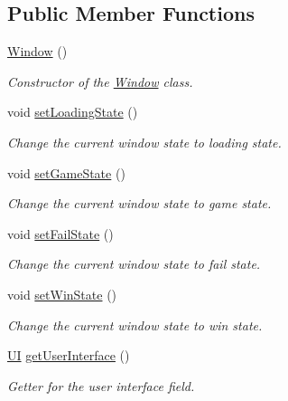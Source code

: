 \subsection*{Public Member Functions}
\begin{DoxyCompactItemize}
\item 
\hyperlink{a00037_ac92fd9c8fc1bc83c8d8bd8b87eb62213}{Window} ()
\begin{DoxyCompactList}\small\item\em Constructor of the \hyperlink{a00037}{Window} class. \end{DoxyCompactList}\item 
void \hyperlink{a00037_a2e2049d1930bb104ec235b0d9ba431fa}{set\-Loading\-State} ()
\begin{DoxyCompactList}\small\item\em Change the current window state to loading state. \end{DoxyCompactList}\item 
void \hyperlink{a00037_a77e3a4c06b4675bc24eefd91a1faaf11}{set\-Game\-State} ()
\begin{DoxyCompactList}\small\item\em Change the current window state to game state. \end{DoxyCompactList}\item 
void \hyperlink{a00037_aa14be01e068317ed09bcbc6d12d8a365}{set\-Fail\-State} ()
\begin{DoxyCompactList}\small\item\em Change the current window state to fail state. \end{DoxyCompactList}\item 
void \hyperlink{a00037_afc31496382fd285df057838b1e38d1c6}{set\-Win\-State} ()
\begin{DoxyCompactList}\small\item\em Change the current window state to win state. \end{DoxyCompactList}\item 
\hyperlink{a00034}{U\-I} \hyperlink{a00037_aab7fb1a0a97c03ddf4e94c5146d4c692}{get\-User\-Interface} ()
\begin{DoxyCompactList}\small\item\em Getter for the user interface field. \end{DoxyCompactList}\end{DoxyCompactItemize}
